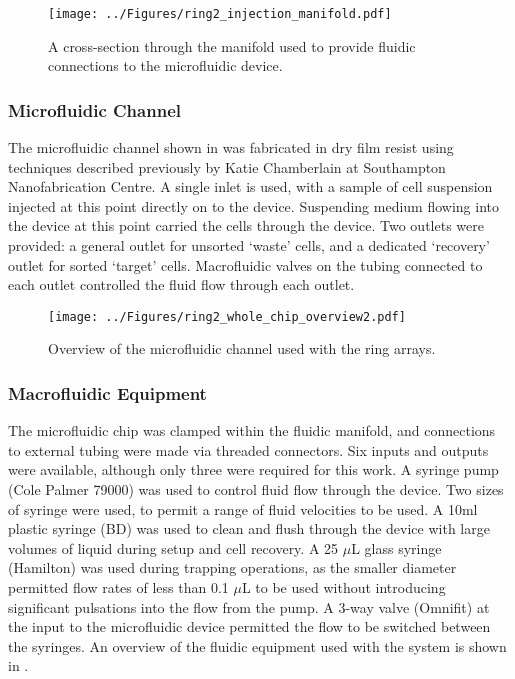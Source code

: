 \begin{figure}
	\centering
		\texttt{[image: ../Figures/ring2\_injection\_manifold.pdf]}
	\caption[A cross-section through the fluidic manifold.]{A cross-section through the manifold used to provide fluidic connections to the microfluidic device.}
	\label{fig:ring2_injection_manifold}
\end{figure}

\subsubsection{Microfluidic Channel}
The microfluidic channel shown in  was fabricated in dry film resist using techniques described previously by Katie Chamberlain at Southampton Nanofabrication Centre. A single inlet is used, with a sample of cell suspension injected at this point directly on to the device. Suspending medium flowing into the device at this point carried the cells through the device. Two outlets were provided: a general outlet for unsorted `waste' cells, and a dedicated `recovery' outlet for sorted `target' cells. Macrofluidic valves on the tubing connected to each outlet controlled the fluid flow through each outlet.

\begin{figure}
	\centering
		\texttt{[image: ../Figures/ring2\_whole\_chip\_overview2.pdf]}
	\caption[Overview of the microfluidic channel used with the ring array device.]{Overview of the microfluidic channel used with the ring arrays.}
	\label{fig:ring2_whole_chip_overview}
\end{figure}

\subsubsection{Macrofluidic Equipment}
The microfluidic chip was clamped within the fluidic manifold, and connections to external tubing were made via threaded connectors. Six inputs and outputs were available, although only three were required for this work. A syringe pump (Cole Palmer 79000) was used to control fluid flow through the device. Two sizes of syringe were used, to permit a range of fluid velocities to be used. A 10ml plastic syringe (BD) was used to clean and flush through the device with large volumes of liquid during setup and cell recovery. A 25 $\mu$L glass syringe (Hamilton) was used during trapping operations, as the smaller diameter permitted flow rates of less than 0.1 $\mu$L to be used without introducing significant pulsations into the flow from the pump. A 3-way valve (Omnifit) at the input to the microfluidic device permitted the flow to be switched between the syringes. An overview of the fluidic equipment used with the system is shown in .

